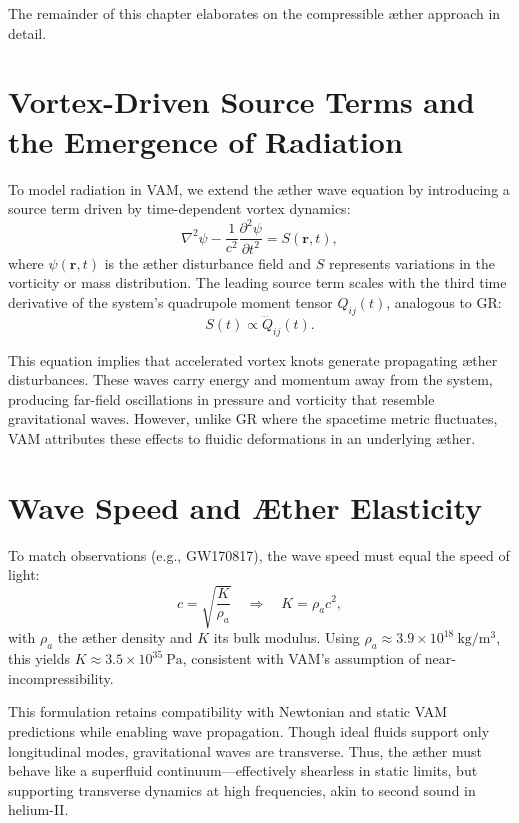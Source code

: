 \documentclass[a4paper, aps,preprint,superscriptaddress, 12pt]{revtex4}
\begin{document}
The remainder of this chapter elaborates on the compressible æther approach in detail.



\section*{Vortex-Driven Source Terms and the Emergence of Radiation}

To model radiation in VAM, we extend the æther wave equation by introducing a source term driven by time-dependent vortex dynamics:
\begin{equation}
\nabla^2 \psi - \frac{1}{c^2} \frac{\partial^2 \psi}{\partial t^2} = S(\mathbf{r}, t),
\end{equation}
where $\psi(\mathbf{r}, t)$ is the æther disturbance field and $S$ represents variations in the vorticity or mass distribution. The leading source term scales with the third time derivative of the system's quadrupole moment tensor $Q_{ij}(t)$, analogous to GR:
\begin{equation}
S(t) \propto \dddot{Q}_{ij}(t).
\end{equation}

This equation implies that accelerated vortex knots generate propagating æther disturbances. These waves carry energy and momentum away from the system, producing far-field oscillations in pressure and vorticity that resemble gravitational waves. However, unlike GR where the spacetime metric fluctuates, VAM attributes these effects to fluidic deformations in an underlying æther.

\section*{Wave Speed and Æther Elasticity}

To match observations (e.g., GW170817), the wave speed must equal the speed of light:
\begin{equation}
c = \sqrt{\frac{K}{\rho_a}} \quad \Rightarrow \quad K = \rho_a c^2,
\end{equation}
with $\rho_a$ the æther density and $K$ its bulk modulus. Using $\rho_a \approx 3.9 \times 10^{18}~\mathrm{kg/m^3}$, this yields $K \approx 3.5 \times 10^{35}~\mathrm{Pa}$, consistent with VAM's assumption of near-incompressibility.

This formulation retains compatibility with Newtonian and static VAM predictions while enabling wave propagation. Though ideal fluids support only longitudinal modes, gravitational waves are transverse. Thus, the æther must behave like a superfluid continuum—effectively shearless in static limits, but supporting transverse dynamics at high frequencies, akin to second sound in helium-II.
\end{document}
